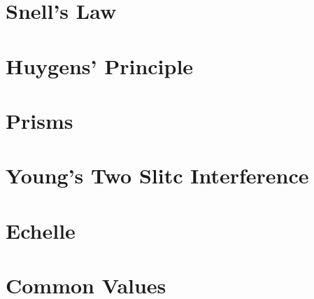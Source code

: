 \documentclass{article}
\begin{document}
\clearpage
\section{Snell's Law}




\clearpage


\clearpage
\section{Huygens' Principle}



\clearpage


\clearpage


\clearpage
\section{Prisms}





\clearpage
\section{Young's Two Slitc Interference}



\clearpage
\section{Echelle}



\clearpage
\section{Common Values}
\end{document}
